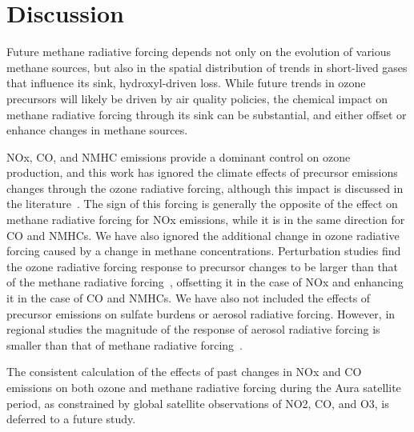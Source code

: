 \section{Discussion}

Future methane radiative forcing depends not only on the evolution of various methane sources, but also in the spatial distribution of trends in short-lived gases that influence its sink, hydroxyl-driven loss. While future trends in ozone precursors will likely be driven by air quality policies, the chemical impact on methane radiative forcing through its sink can be substantial, and either offset or enhance changes in methane sources.

NOx, CO, and NMHC emissions provide a dominant control on ozone production, and this work has ignored the climate effects of precursor emissions changes through the ozone radiative forcing, although this impact is discussed in the literature~\citep{ref:shindell2013}. The sign of this forcing is generally the opposite of the effect on methane radiative forcing for NOx emissions, while it is in the same direction for CO and NMHCs. We have also ignored the additional change in ozone radiative forcing caused by a change in methane concentrations. Perturbation studies find the ozone radiative forcing response to precursor changes to be larger than that of the methane radiative forcing~\citep{ref:akimoto2015}, offsetting it in the case of NOx and enhancing it in the case of CO and NMHCs. We have also not included the effects of precursor emissions on sulfate burdens or aerosol radiative forcing. However, in regional studies the magnitude of the response of aerosol radiative forcing is smaller than that of methane radiative forcing~\citep{ref:fry2012}.

The consistent calculation of the effects of past changes in NOx and CO emissions on both ozone and methane radiative forcing during the Aura satellite period, as constrained by global satellite observations of NO2, CO, and O3, is deferred to a future study.






